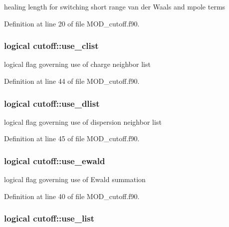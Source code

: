healing length for switching short range van der Waals and mpole terms 



Definition at line 20 of file M\-O\-D\-\_\-cutoff.\-f90.

\hypertarget{classcutoff_a1a4728afeb2081464ffc6ec1d0b210e0}{
\subsubsection[{use\-\_\-clist}]{\setlength{\rightskip}{0pt plus 5cm}logical cutoff\-::use\-\_\-clist}}\label{classcutoff_a1a4728afeb2081464ffc6ec1d0b210e0}


logical flag governing use of charge neighbor list 



Definition at line 44 of file M\-O\-D\-\_\-cutoff.\-f90.

\hypertarget{classcutoff_a8f39dc744b728faec4b715520f090fa2}{
\subsubsection[{use\-\_\-dlist}]{\setlength{\rightskip}{0pt plus 5cm}logical cutoff\-::use\-\_\-dlist}}\label{classcutoff_a8f39dc744b728faec4b715520f090fa2}


logical flag governing use of dispersion neighbor list 



Definition at line 45 of file M\-O\-D\-\_\-cutoff.\-f90.

\hypertarget{classcutoff_a68e2445b2a53329020d82edaa66e6f8c}{
\subsubsection[{use\-\_\-ewald}]{\setlength{\rightskip}{0pt plus 5cm}logical cutoff\-::use\-\_\-ewald}}\label{classcutoff_a68e2445b2a53329020d82edaa66e6f8c}


logical flag governing use of Ewald summation 



Definition at line 40 of file M\-O\-D\-\_\-cutoff.\-f90.

\hypertarget{classcutoff_a0c1a72d650799c1818c677874db443a8}{
\subsubsection[{use\-\_\-list}]{\setlength{\rightskip}{0pt plus 5cm}logical cutoff\-::use\-\_\-list}}\label{classcutoff_a0c1a72d650799c1818c677874db443a8}


